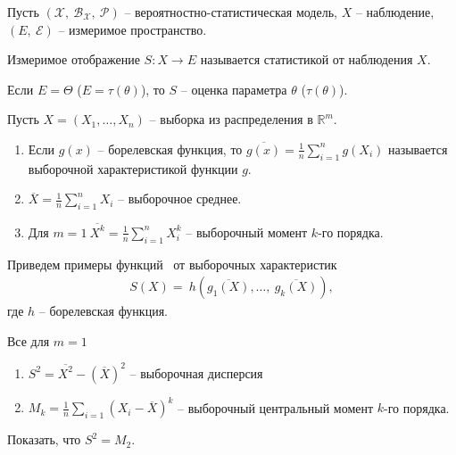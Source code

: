 Пусть $\displaystyle (\mathcal{X},\ \mathcal{B}_{\mathcal{X}},\ \mathcal{P})$ -- вероятностно-статистическая модель, $\displaystyle X$ -- наблюдение, $\displaystyle ( E,\ \mathcal{E})$ -- измеримое пространство.
\begin{definition}
Измеримое отображение $\displaystyle S:X\rightarrow E$ называется статистикой от наблюдения $\displaystyle X$.
\end{definition}
\begin{definition}
Если $\displaystyle E=\Theta $ ($\displaystyle E=\tau ( \theta )$), то $\displaystyle S$ -- оценка параметра $\displaystyle \theta $ ($\displaystyle \tau ( \theta )$).
\end{definition}
\begin{example}
Пусть $\displaystyle X=( X_{1} ,\dotsc ,X_{n})$ -- выборка из распределения в $\displaystyle \mathbb{R}^{m}$.
\begin{enumerate}
    \item Если $\displaystyle g( x)$ -- борелевская функция, то $\displaystyle \overline{g( x)} =\frac{1}{n}\sum _{i=1}^{n} g( X_{i})$ называется выборочной характеристикой функции $\displaystyle g$.
    
    \item $\displaystyle \overline{X} =\frac{1}{n}\sum _{i=1}^{n} X_{i}$ -- выборочное среднее.
    
    \item Для $\displaystyle m=1\ \overline{X^{k}} =\frac{1}{n}\sum _{i=1}^{n} X_{i}^{k}$ -- выборочный момент $\displaystyle k$-го порядка.
\end{enumerate}
\end{example}
Приведем примеры функций \ от выборочных характеристик 
\begin{gather*}
    S( X) =\ h\left(\overline{g_{1}( X)} ,\dotsc,\ \overline{g_{k}( X)}\right),
\end{gather*}
где $h$ -- борелевская функция.
\begin{example}
Все для $\displaystyle m=1$
\begin{enumerate}
    \item $\displaystyle S^{2} =\overline{X^{2}} -(\overline{X})^{2}$ -- выборочная дисперсия
    
    \item $\displaystyle M_{k} =\frac{1}{n}\sum _{i=1}( X_{i} -\overline{X})^{k}$ -- выборочный центральный момент $\displaystyle k$-го порядка.
\end{enumerate}
\end{example}
\begin{exercise}
Показать, что $\displaystyle S^{2} =M_{2}$.
\end{exercise}
